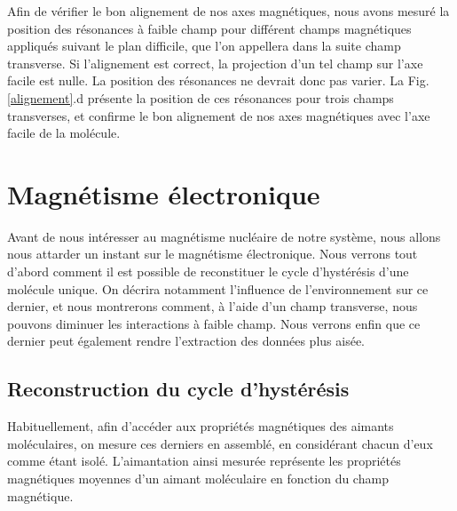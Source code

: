 Afin de vérifier le bon alignement de nos axes magnétiques, nous avons mesuré la position des résonances à faible champ pour différent champs magnétiques appliqués suivant le plan difficile, que l'on appellera dans la suite champ transverse. Si l'alignement est correct, la projection d'un tel champ sur l'axe facile est nulle. La position des résonances ne devrait donc pas varier. La Fig.\ref{alignement}.d présente la position de ces résonances pour trois champs transverses, et confirme le bon alignement de nos axes magnétiques avec l'axe facile de la molécule.

\section{Magnétisme électronique}
Avant de nous intéresser au magnétisme nucléaire de notre système, nous allons nous attarder un instant sur le magnétisme électronique. Nous verrons tout d'abord comment il est possible de reconstituer le cycle d'hystérésis d'une molécule unique. On décrira notamment l'influence de l'environnement sur ce dernier, et nous montrerons comment, à l'aide d'un champ transverse, nous pouvons diminuer les interactions à faible champ. Nous verrons enfin que ce dernier peut également rendre l'extraction des données plus aisée.

\subsection{Reconstruction du cycle d’hystérésis}
Habituellement, afin d'accéder aux propriétés magnétiques des aimants moléculaires, on mesure ces derniers en assemblé, en considérant chacun d'eux comme étant isolé. L'aimantation ainsi mesurée représente les propriétés magnétiques moyennes d'un aimant moléculaire en fonction du champ magnétique.

